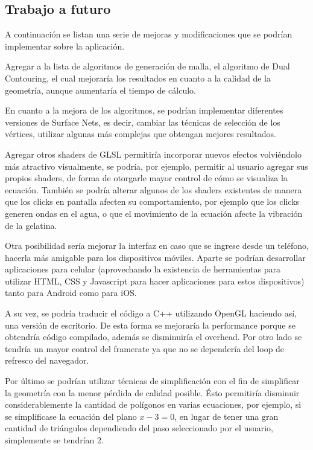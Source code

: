 \documentclass[12pt]{article}
\begin{document}
\subsection{Trabajo a futuro}
\noindent A continuación se listan una serie de mejoras y modificaciones que se podrían implementar sobre la aplicación.

Agregar a la lista de algoritmos de generación de malla, el algoritmo de Dual Contouring\cite{dualcontour}, el cual mejoraría los resultados en cuanto a la calidad de la geometría, aunque aumentaría el tiempo de cálculo. 

En cuanto a la mejora de los algoritmos, se podrían implementar diferentes versiones de Surface Nets, es decir, cambiar las técnicas de selección de los vértices, utilizar algunas más complejas que obtengan mejores resultados.

Agregar otros shaders de GLSL permitiría incorporar nuevos efectos volviéndolo más atractivo visualmente, se podría, por ejemplo, permitir al usuario agregar sus propios shaders, de forma de otorgarle  mayor control de cómo se visualiza la ecuación. También se podría alterar algunos de los shaders existentes de manera que los clicks en pantalla afecten su comportamiento, por ejemplo que los clicks generen ondas en el agua, o que el movimiento de la ecuación afecte la vibración de la gelatina.

Otra posibilidad sería mejorar la interfaz en caso que se ingrese desde un teléfono, hacerla más amigable para los dispositivos móviles. Aparte se podrían desarrollar aplicaciones para celular (aprovechando la existencia de herramientas para utilizar HTML, CSS y Javascript para hacer aplicaciones para estos dispositivos) tanto para Android como para iOS. 

A su vez, se podría traducir el código a C++ utilizando OpenGL haciendo así, una versión de escritorio. De esta forma se mejoraría la performance porque se obtendría código compilado, además se disminuiría el overhead. Por otro lado se tendría un mayor control del framerate ya que no se dependería del loop de refresco del navegador.

Por último se podrían utilizar técnicas de simplificación\cite{simplificacion}\cite{realtimerendering} con el fin de simplificar la geometría con la menor pérdida de calidad posible. Ésto permitiría disminuir considerablemente la cantidad de polígonos en varias ecuaciones, por ejemplo, si se simplificase la ecuación del plano $x-3=0$, en lugar de tener una gran cantidad de triángulos dependiendo del paso seleccionado por el usuario, simplemente se tendrían 2.
\end{document}
